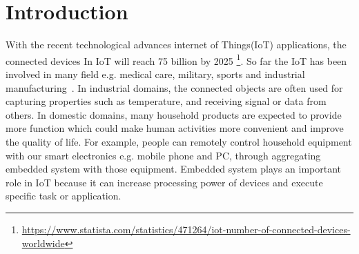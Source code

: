 \chapter{Introduction}






With the recent technological advances internet of Things(IoT) applications, the
connected devices In IoT will reach 75 billion by 2025
\footnote{\url{https://www.statista.com/statistics/471264/iot-number-of-connected-devices-worldwide}}. 
So far the IoT has been involved in many field e.g. medical care, military,
sports and industrial manufacturing~\cite{boudargham2017exhaustive,
lai2013survey, da2014internet}. In industrial domains, the connected objects are
often used for capturing properties such as temperature, and receiving signal or
data from others. In domestic domains, many household products are expected to
provide more function which could make human activities more convenient and
improve the quality of life. For example, people can remotely control household
equipment with our smart electronics e.g. mobile phone and PC, through
aggregating embedded system with those equipment. Embedded system plays an
important role in IoT because it can increase processing power of devices and
execute specific task or application. 

